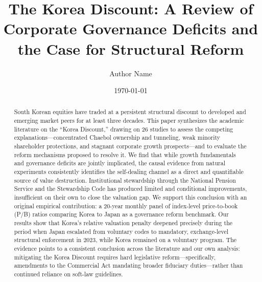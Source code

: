 \documentclass{article}
\title{The Korea Discount: A Review of Corporate Governance Deficits and the Case for Structural Reform}
\author{Author Name}
\date{\today}
\begin{document}
\maketitle

\begin{abstract}
South Korean equities have traded at a persistent structural discount to developed and emerging market peers for at least three decades. This paper synthesizes the academic literature on the ``Korea Discount,'' drawing on 26 studies to assess the competing explanations---concentrated Chaebol ownership and tunneling, weak minority shareholder protections, and stagnant corporate growth prospects---and to evaluate the reform mechanisms proposed to resolve it. We find that while growth fundamentals and governance deficits are jointly implicated, the causal evidence from natural experiments consistently identifies the self-dealing channel as a direct and quantifiable source of value destruction. Institutional stewardship through the National Pension Service and the Stewardship Code has produced limited and conditional improvements, insufficient on their own to close the valuation gap. We support this conclusion with an original empirical contribution: a 20-year monthly panel of index-level price-to-book (P/B) ratios comparing Korea to Japan as a governance reform benchmark. Our results show that Korea's relative valuation penalty deepened precisely during the period when Japan escalated from voluntary codes to mandatory, exchange-level structural enforcement in 2023, while Korea remained on a voluntary program. The evidence points to a consistent conclusion across the literature and our own analysis: mitigating the Korea Discount requires hard legislative reform---specifically, amendments to the Commercial Act mandating broader fiduciary duties---rather than continued reliance on soft-law guidelines.
\end{abstract}

\newpage








\end{document}
